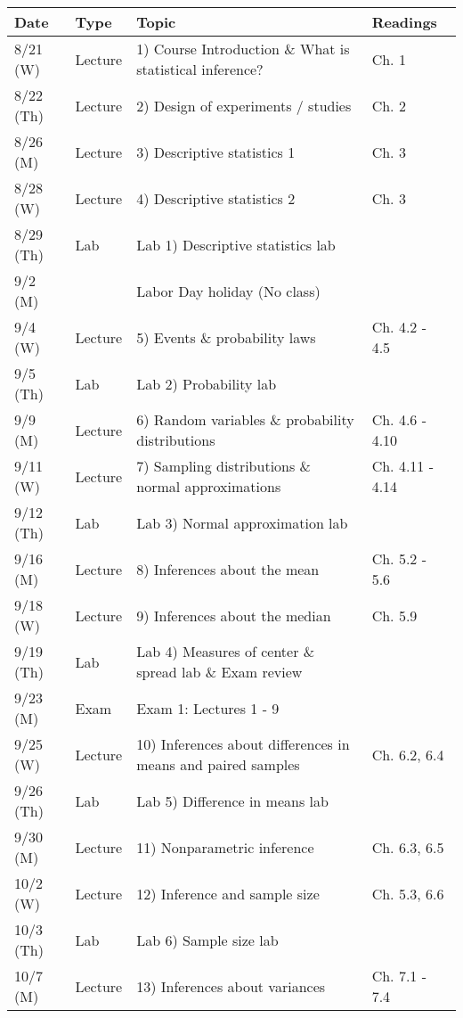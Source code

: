 \documentclass{article}
\begin{document}
\begin{center}
	\begin{tabular}{|p{2cm}|p{1.5cm}|p{9cm}|p{2.8cm}|}
		\hline
		Date & Type & Topic & Readings \\ \hline \hline
		8/21 (W) & Lecture & 1) Course Introduction \& What is statistical inference? & Ch. 1 \\ \hline
		8/22 (Th) & Lecture & 2) Design of experiments / studies & Ch. 2 \\ \hline
		8/26 (M) & Lecture & 3) Descriptive statistics 1 & Ch. 3 \\ \hline
		8/28 (W) & Lecture & 4) Descriptive statistics 2 & Ch. 3 \\ \hline
		8/29 (Th) & Lab & Lab 1) Descriptive statistics lab & \\ \hline
		9/2 (M) & & Labor Day holiday (No class) & \\ \hline
		9/4 (W) & Lecture & 5) Events \& probability laws & Ch. 4.2 - 4.5 \\ \hline
		9/5 (Th) & Lab & Lab 2) Probability lab & \\ \hline
		9/9 (M) & Lecture & 6) Random variables \& probability distributions & Ch. 4.6 - 4.10 \\ \hline
		9/11 (W) & Lecture &  7) Sampling distributions \& normal approximations & Ch. 4.11 - 4.14 \\ \hline
		9/12 (Th) & Lab & Lab 3) Normal approximation lab & \\ \hline
		9/16 (M) & Lecture & 8) Inferences about the mean & Ch. 5.2 - 5.6 \\ \hline
		9/18 (W) & Lecture & 9) Inferences about the median & Ch. 5.9 \\ \hline
		9/19 (Th) & Lab & Lab 4) Measures of center \& spread lab \& Exam review & \\ \hline
		9/23 (M) & Exam & Exam 1: Lectures 1 - 9 & \\ \hline
		9/25 (W) & Lecture & 10) Inferences about differences in means and paired samples & Ch. 6.2, 6.4 \\ \hline
		9/26 (Th) & Lab & Lab 5) Difference in means lab & \\ \hline 
		9/30 (M) & Lecture &  11) Nonparametric inference & Ch. 6.3, 6.5 \\ \hline
		10/2 (W) & Lecture & 12) Inference and sample size & Ch. 5.3, 6.6 \\ \hline
		10/3 (Th) & Lab & Lab 6) Sample size lab & \\ \hline 
		10/7 (M) & Lecture & 13) Inferences about variances & Ch. 7.1 - 7.4 \\ \hline

\end{tabular}
\end{center}
\end{document}
